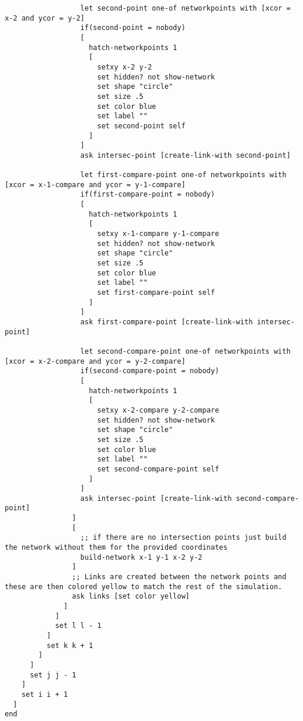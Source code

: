\begin{lstlisting}
                  let second-point one-of networkpoints with [xcor = x-2 and ycor = y-2]
                  if(second-point = nobody)
                  [
                    hatch-networkpoints 1
                    [
                      setxy x-2 y-2
                      set hidden? not show-network
                      set shape "circle"
                      set size .5
                      set color blue
                      set label ""
                      set second-point self
                    ]
                  ]                  
                  ask intersec-point [create-link-with second-point]
                  
                  let first-compare-point one-of networkpoints with [xcor = x-1-compare and ycor = y-1-compare]
                  if(first-compare-point = nobody)
                  [
                    hatch-networkpoints 1
                    [
                      setxy x-1-compare y-1-compare
                      set hidden? not show-network
                      set shape "circle"
                      set size .5
                      set color blue
                      set label ""
                      set first-compare-point self
                    ]
                  ]
                  ask first-compare-point [create-link-with intersec-point]
                  
                  let second-compare-point one-of networkpoints with [xcor = x-2-compare and ycor = y-2-compare]
                  if(second-compare-point = nobody)
                  [
                    hatch-networkpoints 1
                    [
                      setxy x-2-compare y-2-compare
                      set hidden? not show-network
                      set shape "circle"
                      set size .5
                      set color blue
                      set label ""
                      set second-compare-point self
                    ]
                  ]
                  ask intersec-point [create-link-with second-compare-point]                  
                ]
                [
                  ;; if there are no intersection points just build the network without them for the provided coordinates
                  build-network x-1 y-1 x-2 y-2
                ]
                ;; Links are created between the network points and these are then colored yellow to match the rest of the simulation.
                ask links [set color yellow]              
              ]              
            ]
            set l l - 1
          ]
          set k k + 1
        ]
      ]
      set j j - 1
    ]
    set i i + 1
  ]
end


\end{lstlisting}
